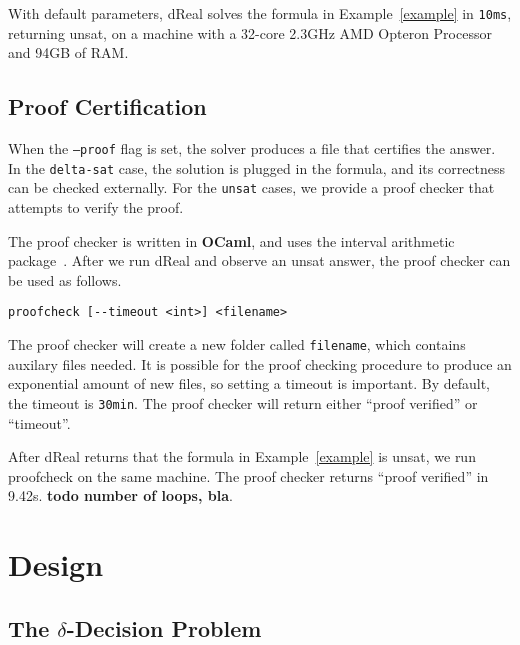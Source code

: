 \documentclass[envcountsect]{llncs}
\begin{document}
\begin{example}
With default parameters, {\sf dReal} solves the formula in 
Example~\ref{example} in {\tt 10ms}, returning {\sf unsat}, on a machine with
a 32-core 2.3GHz AMD Opteron Processor and 94GB of RAM.
\end{example}

\subsection{Proof Certification}\label{proof}

When the {\tt --proof} flag is set, the solver produces a file that certifies
the answer. In the {\tt delta-sat} case, the solution is plugged in the
formula, and its correctness can be checked externally. For the {\tt unsat}
cases, we provide a proof checker that attempts to verify the proof. 

The proof checker is written in {\bf OCaml}, and uses the interval arithmetic
package~\cite{}. After we run {\sf dReal} and observe an {\sf unsat} answer,
the proof checker can be used as follows. 
\begin{verbatim}
proofcheck [--timeout <int>] <filename> 
\end{verbatim}
The proof checker will create a new folder called {\tt filename}, which
contains auxilary files needed. It is possible for the proof
checking procedure to produce an exponential amount of new files, so setting a
 timeout is important. By default, the timeout is {\tt 30min}. The proof
checker will return either ``{\sf proof verified}'' or ``{\sf timeout}''. 

\begin{example}
After {\sf dReal} returns that the formula in Example~\ref{example} is {\sf
unsat}, we run {\sf proofcheck} on the same machine. The proof checker returns
``{\sf proof verified}'' in 9.42s. {\bf todo number of loops, bla}. 
\end{example}




\section{Design}

\subsection{The $\delta$-Decision Problem}\label{deltas}
\end{document}
